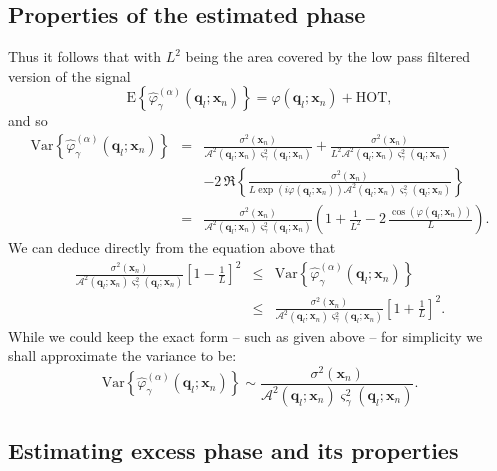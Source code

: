 \documentclass[authoryear,preprint,12pt]{elsarticle}
\newcommand{\var}{\text{Var}}
\newcommand{\HOT}{\text{HOT}}
\newcommand{\E}{\text{E}}
\newcommand{\q}{\mathbf{q}}
\newcommand{\x}{\mathbf{x}}
\newcommand{\cA}{\mathcal{A}}
\begin{document}
\subsection{Properties of the estimated phase}
\label{PropEstPhase}

Thus it follows that with $L^2$ being the area covered by the low pass
filtered version of the signal
\begin{equation}
  \E\left\{\hat\varphi_{\gamma}^{(\alpha)}(\q_l;\x_n)\right\} =
  \varphi(\q_l;\x_n) + \HOT,
\end{equation}
and so
\begin{eqnarray}
  \nonumber 
  \var\left\{\hat\varphi_{\gamma}^{(\alpha)}(\q_l;\x_n)\right\} &=&
  \frac{\sigma^2(\x_n)}{{\cA}^2(\q_l;\x_n)\varsigma_{\gamma}^2(\q_l;\x_n)} +
  \frac{\sigma^2(\x_n)}{L^2{\cA}^2(\q_l;\x_n)\varsigma_{\gamma}^2(\q_l;\x_n)}\\ 
  \nonumber
  & & - 2 \,
  \Re\left\{\frac{\sigma^2(\x_n)}{L\exp\left(i\varphi(\q_l;\x_n)\right) 
    {\cA}^2(\q_l;\x_n) \varsigma_{\gamma}^2(\q_l;\x_n)}\right\}\\ 
  \nonumber
  &=& \frac{\sigma^2(\x_n)}{{\cA}^2(\q_l;\x_n)\varsigma_{\gamma}^2(\q_l;\x_n)}
  \left(1+\frac{1}{L^2} -2 \, 
  \frac{\cos\left(\varphi(\q_l;\x_n)\right)}{L}\right).
\end{eqnarray}
We can deduce directly from the equation above that 
\begin{eqnarray*}
  \frac{\sigma^2(\x_n)}{{\cA}^2(\q_l;\x_n)\varsigma_{\gamma}^2(\q_l;\x_n)}
  \left[1-\frac{1}{L} \right]^2 &\le&
  \var\left\{\hat\varphi_{\gamma}^{(\alpha)}(\q_l;\x_n)\right\}\\
  &\le& 
  \frac{\sigma^2(\x_n)}{{\cA}^2(\q_l;\x_n)\varsigma_{\gamma}^2(\q_l;\x_n)} 
  \left[1 + \frac{1}{L}\right]^2.
\end{eqnarray*}
While we could keep the exact form -- such as given above -- for
simplicity we shall approximate the variance to be:
\begin{equation}
  \var\left\{\hat{\varphi}_{\gamma}^{(\alpha)}(\q_l;\x_n)\right\} \sim
  \frac{\sigma^2(\x_n)}{\cA^2(\q_l;\x_n) \varsigma_{\gamma}^2(\q_l;\x_n)}.
\end{equation}

\subsection{Estimating excess phase and its properties}
\label{EstExcessPhase}
\end{document}
